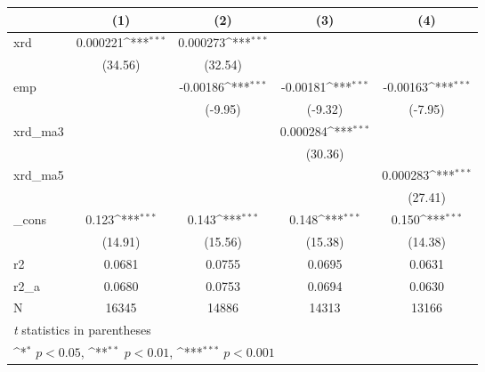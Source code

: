 {
\def\sym#1{\ifmmode^{#1}\else\(^{#1}\)\fi}
\begin{tabular}{l*{4}{c}}
\hline\hline
            &\multicolumn{1}{c}{(1)}         &\multicolumn{1}{c}{(2)}         &\multicolumn{1}{c}{(3)}         &\multicolumn{1}{c}{(4)}         \\
\hline
xrd         &    0.000221\sym{***}&    0.000273\sym{***}&                     &                     \\
            &     (34.56)         &     (32.54)         &                     &                     \\
[1em]
emp         &                     &    -0.00186\sym{***}&    -0.00181\sym{***}&    -0.00163\sym{***}\\
            &                     &     (-9.95)         &     (-9.32)         &     (-7.95)         \\
[1em]
xrd\_ma3     &                     &                     &    0.000284\sym{***}&                     \\
            &                     &                     &     (30.36)         &                     \\
[1em]
xrd\_ma5     &                     &                     &                     &    0.000283\sym{***}\\
            &                     &                     &                     &     (27.41)         \\
[1em]
\_cons      &       0.123\sym{***}&       0.143\sym{***}&       0.148\sym{***}&       0.150\sym{***}\\
            &     (14.91)         &     (15.56)         &     (15.38)         &     (14.38)         \\
\hline
r2          &      0.0681         &      0.0755         &      0.0695         &      0.0631         \\
r2\_a        &      0.0680         &      0.0753         &      0.0694         &      0.0630         \\
N           &       16345         &       14886         &       14313         &       13166         \\
\hline\hline
\multicolumn{5}{l}{\footnotesize \textit{t} statistics in parentheses}\\
\multicolumn{5}{l}{\footnotesize \sym{*} \(p<0.05\), \sym{**} \(p<0.01\), \sym{***} \(p<0.001\)}\\
\end{tabular}
}
